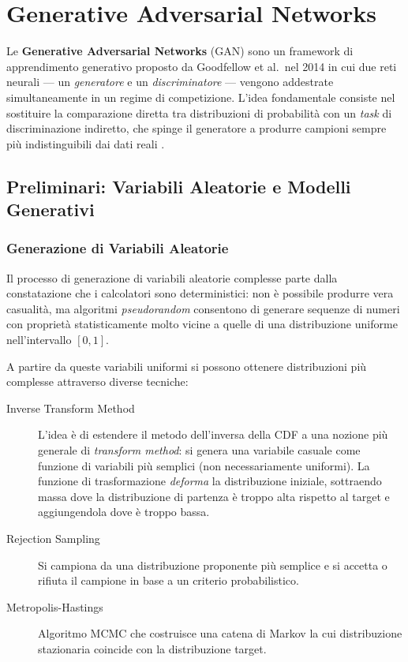 \chapter{Generative Adversarial Networks}
\label{ch:gans}

Le \textbf{Generative Adversarial Networks} (GAN) sono un framework di
apprendimento generativo proposto da Goodfellow et al.\ nel 2014 in cui
due reti neurali --- un \emph{generatore} e un \emph{discriminatore} ---
vengono addestrate simultaneamente in un regime di competizione.
L'idea fondamentale consiste nel sostituire la comparazione diretta tra
distribuzioni di probabilità con un \emph{task} di discriminazione
indiretto, che spinge il generatore a produrre campioni sempre più
indistinguibili dai dati reali \citep{bishop2024}.

\section{Preliminari: Variabili Aleatorie e Modelli Generativi}
\label{sec:gan-preliminaries}

\subsection{Generazione di Variabili Aleatorie}
\label{subsec:rand-vars}

Il processo di generazione di variabili aleatorie complesse parte dalla
constatazione che i calcolatori sono deterministici: non è possibile
produrre vera casualità, ma algoritmi \emph{pseudorandom} consentono di
generare sequenze di numeri con proprietà statisticamente molto vicine
a quelle di una distribuzione uniforme nell'intervallo $[0,1]$.

A partire da queste variabili uniformi si possono ottenere distribuzioni
più complesse attraverso diverse tecniche:

\begin{description}
  \item[Inverse Transform Method] L'idea è di estendere il metodo
        dell'inversa della CDF a una nozione più generale di
        \emph{transform method}: si genera una variabile casuale come
        funzione di variabili più semplici (non necessariamente uniformi).
        La funzione di trasformazione \emph{deforma} la distribuzione
        iniziale, sottraendo massa dove la distribuzione di partenza è
        troppo alta rispetto al target e aggiungendola dove è troppo
        bassa.
  \item[Rejection Sampling] Si campiona da una distribuzione
        proponente più semplice e si accetta o rifiuta il campione in
        base a un criterio probabilistico.
  \item[Metropolis-Hastings] Algoritmo MCMC che costruisce una catena
        di Markov la cui distribuzione stazionaria coincide con la
        distribuzione target.
\end{description}

